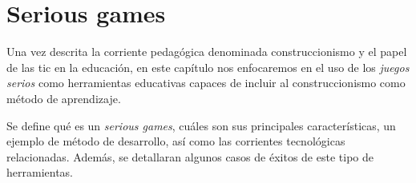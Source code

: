 \chapter{Serious games}

Una vez descrita la corriente pedagógica denominada construccionismo y el papel
de las \Gls{tic} en la educación, en este capítulo nos enfocaremos en el uso de
los \textit{juegos serios} como herramientas educativas capaces de  incluir al
construccionismo como método de aprendizaje.

Se define qué es un \textit{serious games}, cuáles son sus principales
características, un ejemplo de método de desarrollo, así como las corrientes
tecnológicas relacionadas. Además, se detallaran algunos casos de éxitos de este
tipo de herramientas.






